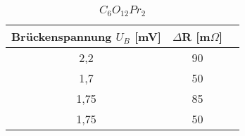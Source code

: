 \begin{table}[h]
	\begin{center}
		\begin{tabular}{ccc}
			Brückenspannung $U_B$ [mV] & $\Delta$R [m$\Omega$]\\ \hline
			2,2	&90\\
			1,7	&50\\
			1,75&85\\
			1,75&50\\
		\end{tabular}
		\caption{$C_6O_{12}Pr_2$}
		\label{tab1}
	\end{center}
\end{table}